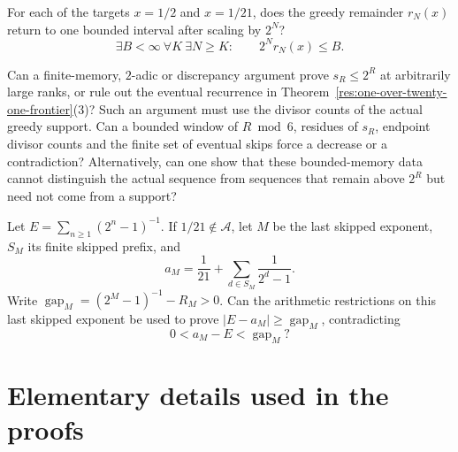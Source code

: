 \documentclass[11pt]{article}
\newcommand{\Ach}{\mathcal A}
\begin{document}
\begin{problem}\label{prob:scaled-return}
For each of the targets $x=1/2$ and $x=1/21$, does the greedy remainder
$r_N(x)$ return to one bounded interval after scaling by $2^N$?
\[
 \exists B<\infty\ \forall K\ \exists N\ge K:
 \qquad 2^N r_N(x)\le B.
\]
\end{problem}

\begin{problem}\label{prob:actual-invariant}
Can a finite-memory, $2$-adic or discrepancy argument prove $s_R\le2^R$
at arbitrarily large ranks, or rule out the eventual recurrence in
Theorem~\ref{res:one-over-twenty-one-frontier}(3)?  Such an argument must use
the divisor counts of the actual greedy support.  Can a bounded window of
$R\bmod6$, residues of $s_R$, endpoint divisor counts and the finite set of
eventual skips force a decrease or a contradiction?  Alternatively, can one
show that these bounded-memory data cannot distinguish the actual sequence
from sequences that remain above $2^R$ but need not come from a support?
\end{problem}

\begin{problem}\label{prob:fatal-interval}
Let $E=\sum_{n\ge1}(2^n-1)^{-1}$.  If $1/21\notin\Ach$, let $M$ be the last
skipped exponent, $S_M$ its finite skipped prefix, and
\[
 a_M=\frac1{21}+\sum_{d\in S_M}\frac1{2^d-1}.
\]
Write $\operatorname{gap}_M=(2^M-1)^{-1}-R_M>0$.
Can the arithmetic restrictions on this last skipped exponent be used to
prove $|E-a_M|\ge\operatorname{gap}_M$, contradicting
\[
 0<a_M-E<\operatorname{gap}_M?
\]
\end{problem}


\section{Elementary details used in the proofs}\label{app:elementary-details}
\end{document}
